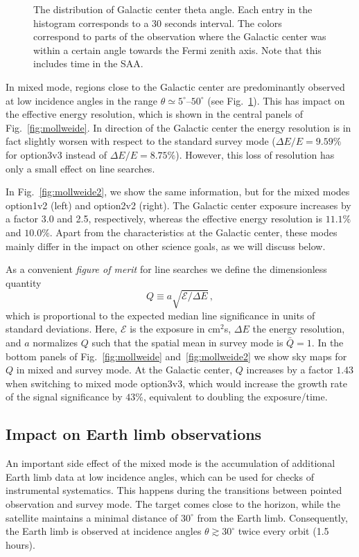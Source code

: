 \documentclass[aps,prd,superscriptaddress,nofootinbib,fixlfloat, 12pt]{revtex4-1}
\begin{document}
\begin{figure}[t]
\begin{center}
    \vspace{-0.5cm}
  \end{center}
  \caption{The distribution of Galactic center theta angle. Each entry in the
  histogram corresponds to a 30 seconds interval. The colors correspond to
  parts of the observation where the Galactic center was within a certain
  angle towards the Fermi zenith axis. Note that this includes time in the SAA.} 
  \label{fig:thetaDist}
\end{figure}

In mixed mode, regions close to the Galactic center are predominantly observed
at low incidence angles in the range $\theta\simeq5^\circ$--$50^\circ$ (see
Fig.~\ref{fig:thetaDist}). This has impact on the effective energy resolution,
which is shown in the central panels of Fig.~\ref{fig:mollweide}. In direction
of the Galactic center the energy resolution is in fact slightly worsen with respect to the
standard survey mode ($\Delta E/E=9.59\%$ for option3v3 instead of $\Delta E/E=8.75\%$).
However, this loss of resolution has only a small effect on line searches.

In Fig.~\ref{fig:mollweide2}, we show the same information, but for the mixed
modes option1v2 (left) and option2v2 (right). The Galactic center exposure increases by a
factor 3.0 and 2.5, respectively, whereas the effective energy resolution is
$11.1\%$ and $10.0\%$. Apart from the characteristics at the Galactic center, these modes
mainly differ in the impact on other science goals, as we will discuss below.
\medskip

As a convenient \emph{figure of merit} for line searches we define the
dimensionless quantity $$Q\equiv a\sqrt{\mathcal{E}/\Delta E}\,,$$ which is
proportional to the expected median line significance in units of standard
deviations.  Here, $\mathcal{E}$ is the exposure in cm$^2$s, $\Delta E$ the
energy resolution, and $a$
normalizes $Q$ such that the spatial mean in survey mode is $\bar Q=1$. In the
bottom panels of Fig.~\ref{fig:mollweide} and~\ref{fig:mollweide2} we show sky maps for $Q$ in mixed and
survey mode.  At the Galactic center, $Q$ increases by a factor $1.43$ when
switching to mixed mode option3v3, which would increase the growth rate of
the signal significance by $43\%$, equivalent to doubling the exposure/time. 

\subsection{Impact on Earth limb observations}
An important side effect of the mixed mode is the accumulation of
additional Earth limb data at low incidence angles, which can be used for
checks of instrumental systematics. This happens during the
transitions between pointed observation and survey mode. The target comes
close to the horizon, while the satellite maintains a minimal distance of
$30^\circ$ from the Earth limb. Consequently, the Earth limb is observed at
incidence angles $\theta\gtrsim30^\circ$ twice every orbit (1.5 hours).
\end{document}
